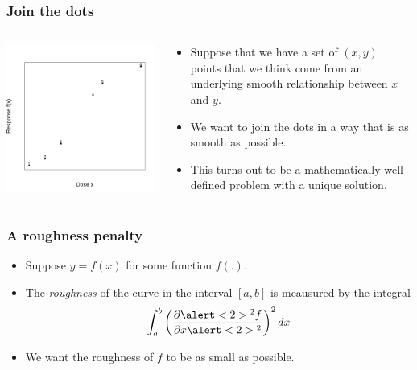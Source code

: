 \documentclass[aspectratio=169]{beamer}
\begin{document}
\begin{frame}
  \frametitle{Join the dots}

    \begin{columns}
    \begin{column}{6cm}
      \includegraphics[scale=0.4]{figures/dose-response-points.png}
    \end{column}
    \begin{column}{6cm}
      \begin{itemize}
      \item Suppose that we have a set of $(x,y)$ points that we think
        come from an underlying smooth relationship between $x$ and
        $y$.
      \item We want to join the dots in a way that is as smooth as
        possible.
      \item This turns out to be a mathematically well defined problem
        with a unique solution.
      \end{itemize}
    \end{column}
  \end{columns}

\end{frame}


\begin{frame}
  \frametitle{A roughness penalty}

  \begin{itemize}
  \item Suppose $y = f(x)$ for some function $f(.)$.
  \item The {\em roughness} of the curve in the interval $[a,b]$ is
    meausured by the integral
    \[
      \int_a^b \left(
        \frac{\partial\alert<2>{^2} f}{\partial x\alert<2>{^2}}
      \right)^2 dx
    \]
  \item We want the roughness of $f$ to be as small as possible.
  \end{itemize}
\end{frame}
\end{document}
